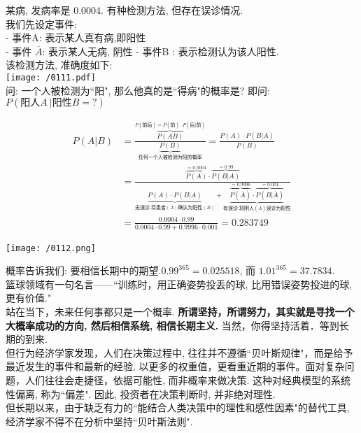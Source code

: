 \documentclass[UTF8]{ctexart}
\begin{document}
\vspace{1em} 




\begin{myEnvSample}
某病, 发病率是 0.0004. 有种检测方法, 但存在误诊情况. \\
我们先设定事件: \\
- 事件A: 表示某人真有病,即阳性 \\
- 事件 $\overline{A}$: 表示某人无病, 阴性 
- 事件B : 表示检测认为该人阳性. \\

该检测方法, 准确度如下: \\
\texttt{[image: /0111.pdf]} \\

问: 一个人被检测为``阳", 那么他真的是``得病"的概率是? 即问: $P(\text{阳人}A \ |\text{阳性}B=?)$ 

\begin{align*}  %
	P(A|B) &=\frac{\overset{P(\text{前后})=P(\text{前})\cdot P(\text{后|前})}{\overbrace{P\left( AB \right) }}}{\underset{\text{任何一个人被检测为阳的概率}}{\underbrace{P\left( B \right) }}}=\frac{P\left( A \right) \cdot P\left( B|A \right)}{P\left( B \right)}\\
&=\frac{\overset{=0.0004}{\overbrace{P\left( A \right) }}\cdot \overset{=0.99}{\overbrace{P\left( B|A \right) }}}{\underset{\text{无误诊,将患者}(A)\text{确认为阳性}(B)}{\underbrace{P\left( A \right) \cdot P\left( B|A \right) }}+\underset{\text{有误诊,将阴人}(\overline{A})\text{误诊为阳性}}{\underbrace{\overset{=0.9996}{\overbrace{P\left( \overline{A} \right) }}\cdot \overset{=0.001}{\overbrace{P\left( B|\overline{A} \right) }}}}}\\
&=\frac{0.0004\cdot 0.99}{0.0004\cdot 0.99+0.9996\cdot 0.001}=0.283749
\end{align*}


\texttt{[image: /0112.png]}

\end{myEnvSample}
\vspace{1em} 



概率告诉我们: 要相信长期中的期望.$0.99^{365}=0.025518$, 而 $ 1.01^{365}=37.7834$.   \\
篮球领域有一句名言——``训练时，用正确姿势投丢的球, 比用错误姿势投进的球, 更有价值." \\
站在当下，未来任何事都只是一个概率. \textbf{所谓坚持，所谓努力，其实就是寻找一个大概率成功的方向, 然后相信系统, 相信长期主义.} 当然，你得坚持活着．等到长期的到来.  \\

但行为经济学家发现，人们在决策过程中, 往往并不遵循``贝叶斯规律"，而是给予最近发生的事件和最新的经验, 以更多的权重值，更看重近期的事件。面对复杂问题，人们往往会走捷径，依据可能性, 而非概率来做决策. 这种对经典模型的系统性偏离, 称为``偏差". 因此, 投资者在决策判断时, 并非绝对理性.  \\
但长期以来，由于缺乏有力的``能结合人类决策中的理性和感性因素"的替代工具, 经济学家不得不在分析中坚持``贝叶斯法则".



	
	
	
\end{document}
